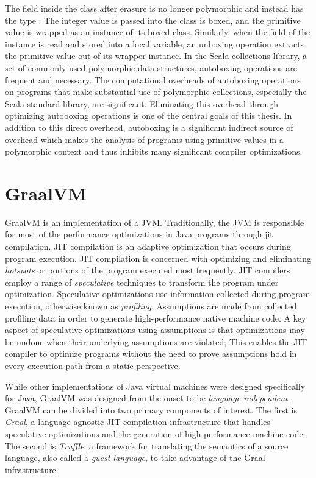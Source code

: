 The  field inside the  class after erasure is no longer polymorphic and instead has the type . 
The integer value  is passed into the  class is boxed, and the primitive value is wrapped as an instance of its boxed class.
Similarly, when the  field of the instance is read and stored into a local variable, an unboxing operation extracts the primitive value out of its wrapper instance.
In the Scala collections library, a set of commonly used polymorphic data structures, autoboxing operations are frequent and necessary.
The computational overheads of autoboxing operations on programs that make substantial use of polymorphic collections, especially the Scala standard library, are significant\cite{scala:collections-optimization}.
Eliminating this overhead through optimizing autoboxing operations is one of the central goals of this thesis.
In addition to this direct overhead, autoboxing is a significant indirect source of overhead which makes the analysis of programs using primitive values in a polymorphic context and thus inhibits many significant compiler optimizations.

\section{GraalVM}

GraalVM\cite{java:graalvm} is an implementation of a JVM.
Traditionally, the JVM is responsible for most of the performance optimizations in Java programs\cite{java:hotspot} through \acrfull{jit} compilation.
JIT compilation is an adaptive optimization that occurs during program execution.
JIT compilation is concerned with optimizing and eliminating \textit{hotspots} or portions of the program executed most frequently.
JIT compilers\cite{java:sablevm}\cite{java:jikesrvm} employ a range of \textit{speculative} techniques to transform the program under optimization.
Speculative optimizations use information collected during program execution, otherwise known as \textit{profiling}. 
Assumptions are made from collected profiling data in order to generate high-performance native machine code.
A key aspect of speculative optimizations using assumptions is that optimizations may be undone when their underlying assumptions are violated; This enables the JIT compiler to optimize programs without the need to prove assumptions hold in every execution path from a static perspective.

While other implementations of Java virtual machines were designed specifically for Java, GraalVM was designed from the onset to be \textit{language-independent}.
GraalVM can be divided into two primary components of interest. 
The first is \textit{Graal}, a language-agnostic JIT compilation infrastructure that handles speculative optimizations and the generation of high-performance machine code.
The second is \textit{Truffle}, a framework for translating the semantics of a source language, also called a \textit{guest language}, to take advantage of the Graal infrastructure.

